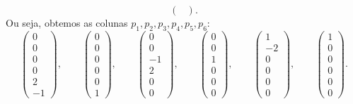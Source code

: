 \documentclass[11pt,a4paper]{article}
\begin{document}
{\[\begin{pmatrix}
\end{pmatrix}.
\]
Ou seja, obtemos as colunas $p_1,p_2,p_3,p_4,p_5,p_6$:
\[
\begin{pmatrix}
0\\0\\0\\0\\2\\-1
\end{pmatrix},\quad\quad
\begin{pmatrix}
0\\0\\0\\0\\0\\1
\end{pmatrix},\quad\quad
\begin{pmatrix}
0\\0\\-1\\2\\0\\0
\end{pmatrix},\quad\quad
\begin{pmatrix}
0\\0\\1\\0\\0\\0
\end{pmatrix},\quad\quad
\begin{pmatrix}
1\\-2\\0\\0\\0\\0
\end{pmatrix},\quad\quad
\begin{pmatrix}
1\\0\\0\\0\\0\\0
\end{pmatrix}.
\]

}
\end{document}

